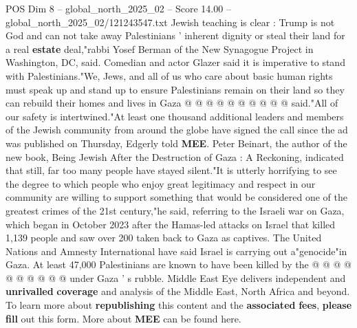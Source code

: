 \begin{textsample}{POS Dim 8 – global\_north\_2025\_02 – Score 14.00 – global\_north\_2025\_02/121243547.txt}
Jewish teaching is clear : Trump is not God and can not take away Palestinians ' inherent dignity or steal their land for a real \textbf{estate} deal,"rabbi Yosef Berman of the New Synagogue Project in Washington, DC, said.
Comedian and actor Glazer said it is imperative to stand with Palestinians."We, Jews, and all of us who care about basic human rights must speak up and stand up to ensure Palestinians remain on their land so they can rebuild their homes and lives in Gaza @ @ @ @ @ @ @ @ @ @ said."All of our safety is intertwined."At least one thousand additional leaders and members of the Jewish community from around the globe have signed the call since the ad was published on Thursday, Edgerly told \textbf{MEE}.
Peter Beinart, the author of the new book, Being Jewish After the Destruction of Gaza : A Reckoning, indicated that still, far too many people have stayed silent."It is utterly horrifying to see the degree to which people who enjoy great legitimacy and respect in our community are willing to support something that would be considered one of the greatest crimes of the 21st century,"he said, referring to the Israeli war on Gaza, which began in October 2023 after the Hamas-led attacks on Israel that killed 1,139 people and saw over 200 taken back to Gaza as captives.
The United Nations and Amnesty International have said Israel is carrying out a"genocide"in Gaza.
At least 47,000 Palestinians are known to have been killed by the @ @ @ @ @ @ @ @ @ @ under Gaza ' s rubble.
Middle East Eye delivers independent and \textbf{unrivalled} \textbf{coverage} and analysis of the Middle East, North Africa and beyond.
To learn more about \textbf{republishing} this content and the \textbf{associated} \textbf{fees}, \textbf{please} \textbf{fill} out this form.
More about \textbf{MEE} can be found here.

\end{textsample}
